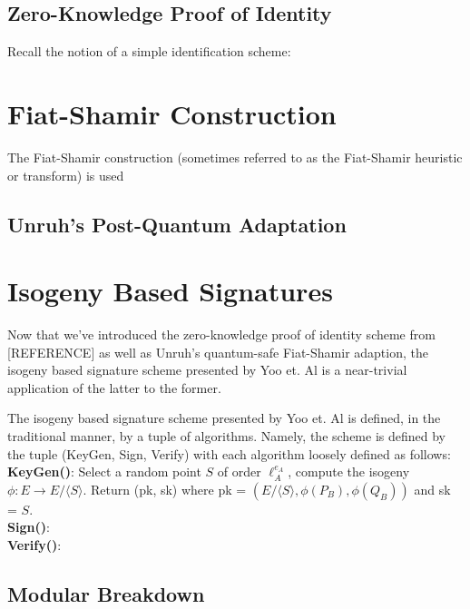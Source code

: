 \subsection{Zero-Knowledge Proof of Identity}

Recall the notion of a simple identification scheme:

\section{Fiat-Shamir Construction}

The Fiat-Shamir construction (sometimes referred to as the Fiat-Shamir heuristic or transform) is used

\subsection{Unruh's Post-Quantum Adaptation}



\section{Isogeny Based Signatures}

Now that we've introduced the zero-knowledge proof of identity scheme from [REFERENCE] as well as Unruh's quantum-safe Fiat-Shamir adaption, the isogeny based signature scheme presented by Yoo et. Al is a near-trivial application of the latter to the former. 

The isogeny based signature scheme presented by Yoo et. Al is defined, in the traditional manner, by a tuple of algorithms. Namely, the scheme is defined by the tuple (KeyGen, Sign, Verify) with each algorithm loosely defined as follows:\\
\textbf{KeyGen(}\textbf{)}: Select a random point $S$ of order $\ell_{A}^{e_A}$, compute the isogeny $\phi: E \rightarrow E/ \langle S \rangle$. Return (pk, sk) where pk = $(E/ \langle S \rangle, \phi(P_B), \phi(Q_B))$ and sk = $S$.\\
\textbf{Sign()}:\\
\textbf{Verify()}:\\


\subsection{Modular Breakdown}


